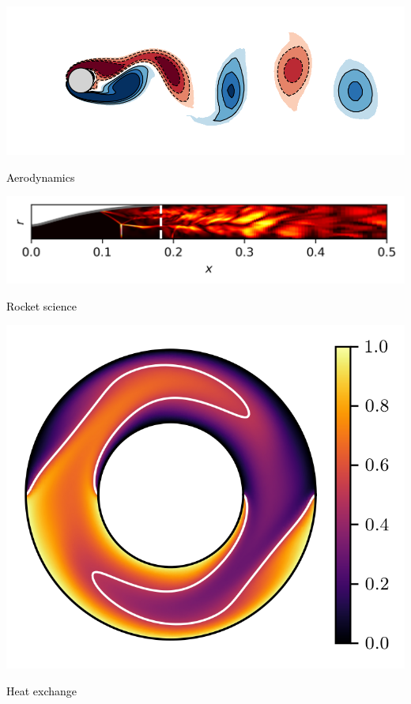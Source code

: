\documentclass[aspectratio=169]{beamer}
\begin{document}
{

\begin{frame}%
  \vfill
  \begin{minipage}{.68\textwidth}
    \centering
    \includegraphics[width=\textwidth]{snapshot_re125_0}

    {\small \textcolor{black}{Aerodynamics}}

    \bigskip

    \includegraphics[width=\textwidth]{tic_m=1_fourier_mode_snapshot}

    {\small \textcolor{black}{Rocket science}}
  \end{minipage}%
  \hfill
  \begin{minipage}{.28\textwidth}
    \centering
    \includegraphics[width=\textwidth]{temperature_field_00000}

    {\small \textcolor{black}{Heat exchange}}
  \end{minipage}

  \vfill
\end{frame}
}
\end{document}
